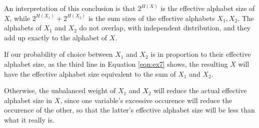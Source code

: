 \begin{exercise}
\begin{solution}
\begin{enumerate}
{        An interpretation of this conclusion is that $2^{H(X)}$ is the effective alphabet size of $X$, while $2^{H(X_1)}+2^{H(X_2)}$ is the sum sizes of the effective alphabets $X_1,X_2$. The alphabets of $X_1$ and $X_2$ do not overlap, with independent distribution, and they add up exactly to the alphabet of $X$. 

        If our probability of choice between $X_1$ and $X_2$ is in proportion to their effective alphabet size, as the third line in Equation \ref{eqn:ex7} shows, the resulting $X$ will have the effective alphabet size equivalent to the sum of $X_1$ and $X_2$.

        Otherwise, the unbalanced weight of $X_1$ and $X_2$ will reduce the actual effective alphabet size in $X$, since one variable's excessive occurence will reduce the occurence of the other, so that the latter's effective alphabet size will be less than what it really is.
      }
    \end{enumerate}
  \end{solution}
  \end{exercise}


